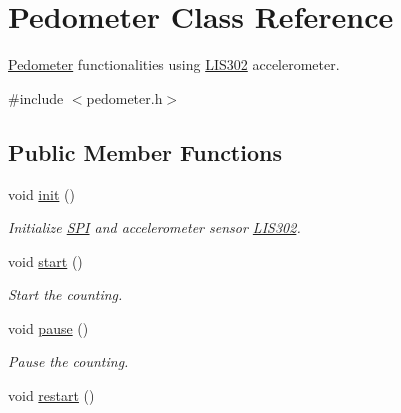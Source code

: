 \hypertarget{class_pedometer}{\section{Pedometer Class Reference}
\label{class_pedometer}
}


\hyperlink{class_pedometer}{Pedometer} functionalities using \hyperlink{class_l_i_s302}{L\-I\-S302} accelerometer.  




{\ttfamily \#include $<$pedometer.\-h$>$}

\subsection*{Public Member Functions}
\begin{DoxyCompactItemize}
\item 
\hypertarget{class_pedometer_a8f0c7938e375751d3d34fdcb6c4880c6}{void \hyperlink{class_pedometer_a8f0c7938e375751d3d34fdcb6c4880c6}{init} ()}\label{class_pedometer_a8f0c7938e375751d3d34fdcb6c4880c6}

\begin{DoxyCompactList}\small\item\em Initialize \hyperlink{class_s_p_i}{S\-P\-I} and accelerometer sensor \hyperlink{class_l_i_s302}{L\-I\-S302}. \end{DoxyCompactList}\item 
\hypertarget{class_pedometer_a6ba723efbe52177d23c41aa63d4f55d1}{void \hyperlink{class_pedometer_a6ba723efbe52177d23c41aa63d4f55d1}{start} ()}\label{class_pedometer_a6ba723efbe52177d23c41aa63d4f55d1}

\begin{DoxyCompactList}\small\item\em Start the counting. \end{DoxyCompactList}\item 
\hypertarget{class_pedometer_a81c83bde8af270c3596ffc08f256cf65}{void \hyperlink{class_pedometer_a81c83bde8af270c3596ffc08f256cf65}{pause} ()}\label{class_pedometer_a81c83bde8af270c3596ffc08f256cf65}

\begin{DoxyCompactList}\small\item\em Pause the counting. \end{DoxyCompactList}\item 
\hypertarget{class_pedometer_ae9beddf74190d07ff611e21a9c490faa}{void \hyperlink{class_pedometer_ae9beddf74190d07ff611e21a9c490faa}{restart} ()}\label{class_pedometer_ae9beddf74190d07ff611e21a9c490faa}


\end{DoxyCompactItemize}
